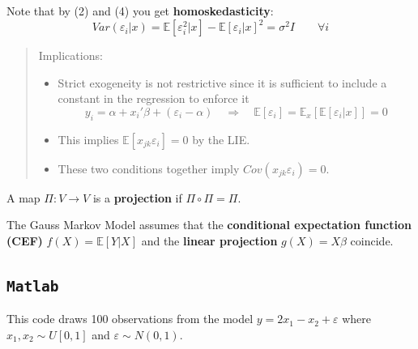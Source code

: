 \documentclass[12pt,]{book}
\newenvironment{Shaded}{\begin{snugshade}}{\end{snugshade}}
\newcommand{\CommentTok}[1]{\textcolor[rgb]{0.56,0.35,0.01}{\textit{#1}}}
\newcommand{\FloatTok}[1]{\textcolor[rgb]{0.00,0.00,0.81}{#1}}
\newcommand{\NormalTok}[1]{#1}
\providecommand{\tightlist}{%
  \setlength{\itemsep}{0pt}\setlength{\parskip}{0pt}}
\begin{document}
Note that by (2) and (4) you get \textbf{homoskedasticity}:
\[
Var(\varepsilon_i|x) = \mathbb E[\varepsilon_i^2|x]- \mathbb E[\varepsilon_i|x]^2 = \sigma^2 I \qquad \forall i
\]

\begin{quote}
Implications:

\begin{itemize}
\tightlist
\item
  Strict exogeneity is not restrictive since it is sufficient to include a constant in the regression to enforce it
  \[
  y_i = \alpha + x_i'\beta + (\varepsilon_i - \alpha) \quad \Rightarrow \quad \mathbb E[\varepsilon_i] = \mathbb E_x [ \mathbb E[ \varepsilon_i | x]] = 0
  \]
\item
  This implies \(\mathbb E[x _ {jk} \varepsilon_i ] = 0\) by the LIE.
\item
  These two conditions together imply \(Cov (x _ {jk} \varepsilon_i ) = 0\).
\end{itemize}
\end{quote}

A map \(\Pi: V \to V\) is a \textbf{projection} if \(\Pi \circ \Pi = \Pi\).

The Gauss Markov Model assumes that the \textbf{conditional expectation function (CEF)} \(f(X) = \mathbb E[Y|X]\) and the \textbf{linear projection} \(g(X) = X \beta\) coincide.

\hypertarget{matlab}{%
\subsection{\texorpdfstring{\texttt{Matlab}}{Matlab}}\label{matlab}}

This code draws 100 observations from the model \(y = 2 x_1 - x_2 + \varepsilon\) where \(x_1, x_2 \sim U[0,1]\) and \(\varepsilon \sim N(0,1)\).

\begin{Shaded}
\end{Shaded}
\end{document}
